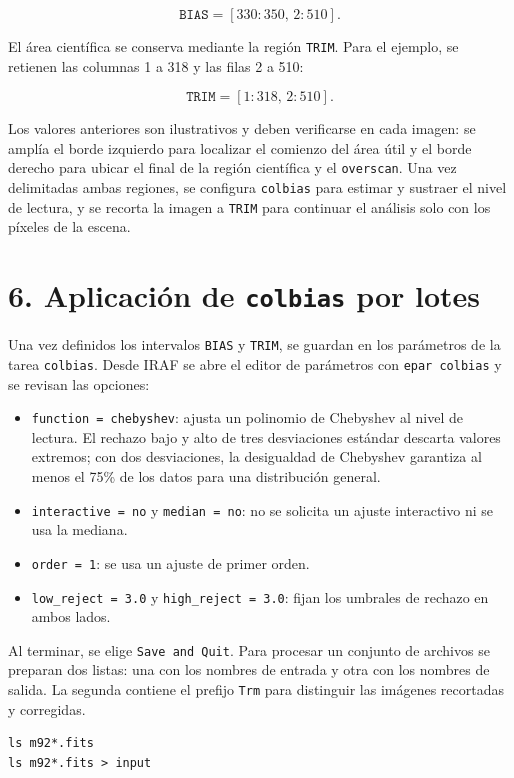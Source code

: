 \documentclass[11pt]{article}
\begin{document}
\[
  \texttt{BIAS} = [330:350,\,2:510].
\]

El área científica se conserva mediante la región \texttt{TRIM}. Para el
ejemplo, se retienen las columnas 1 a 318 y las filas 2 a 510:

\[
  \texttt{TRIM} = [1:318,\,2:510].
\]

Los valores anteriores son ilustrativos y deben verificarse en cada imagen:
se amplía el borde izquierdo para localizar el comienzo del área útil y el
borde derecho para ubicar el final de la región científica y el
\texttt{overscan}. Una vez delimitadas ambas regiones, se configura
\texttt{colbias} para estimar y sustraer el nivel de lectura, y se recorta la
imagen a \texttt{TRIM} para continuar el análisis solo con los píxeles de la
escena.


\newpage
\section*{6. Aplicación de \texttt{colbias} por lotes}

Una vez definidos los intervalos \texttt{BIAS} y \texttt{TRIM}, se guardan en
los parámetros de la tarea \texttt{colbias}. Desde IRAF se abre el editor de
parámetros con \texttt{epar colbias} y se revisan las opciones:

\begin{itemize}
  \item \texttt{function = chebyshev}: ajusta un polinomio de Chebyshev al
  nivel de lectura. El rechazo bajo y alto de tres desviaciones estándar
  descarta valores extremos; con dos desviaciones, la desigualdad de
  Chebyshev garantiza al menos el 75\% de los datos para una distribución
  general.
  \item \texttt{interactive = no} y \texttt{median = no}: no se solicita un
  ajuste interactivo ni se usa la mediana.
  \item \texttt{order = 1}: se usa un ajuste de primer orden.
  \item \texttt{low\_reject = 3.0} y \texttt{high\_reject = 3.0}: fijan los
  umbrales de rechazo en ambos lados.
\end{itemize}

Al terminar, se elige \texttt{Save and Quit}. Para procesar un conjunto de
archivos se preparan dos listas: una con los nombres de entrada y otra con los
nombres de salida. La segunda contiene el prefijo \texttt{Trm} para distinguir
las imágenes recortadas y corregidas.

\begin{verbatim}
ls m92*.fits
ls m92*.fits > input
\end{verbatim}
\end{document}
